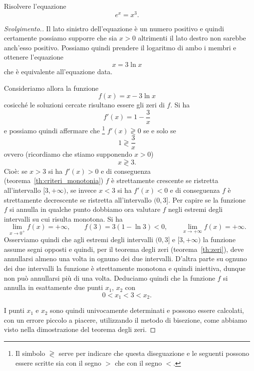 \begin{exercise}
Risolvere l'equazione
\begin{equation} \label{eq:4734521}
  e^x = x^3.
\end{equation}
\end{exercise}
%
\begin{proof}[Svolgimento.]
Il lato sinistro dell'equazione è un numero positivo e quindi
certamente possiamo supporre che sia $x>0$ altrimenti il lato destro non sarebbe anch'esso positivo.
Possiamo quindi prendere il logaritmo di ambo i membri
e ottenere l'equazione
\[
  x = 3 \ln x
\]
che è equivalente all'equazione data.

Consideriamo allora la funzione
\[
 f(x) = x - 3 \ln x
\]
cosicché le soluzioni cercate risultano essere gli zeri di $f$.
Si ha
\[
  f'(x) = 1 - \frac{3}{x}
\]
e possiamo quindi affermare che%
\footnote{Il simbolo $\gtrless$ serve per indicare che questa
diseguazione e le seguenti possono essere scritte sia con il segno
$>$ che con il segno $<$.}
 $f'(x) \gtrless 0$
se e solo se
\[
  1 \gtrless \frac 3 x
\]
ovvero (ricordiamo che stiamo supponendo $x>0$)
\[
  x \gtrless 3.
\]
Cioè: se $x>3$ si ha $f'(x)>0$ e di conseguenza
(teorema~\ref{th:criteri_monotonia})
$f$ è strettamente crescente se ristretta all'intervallo
$[3,+\infty)$,
se invece $x<3$ si ha $f'(x)<0$ e di conseguenza
$f$ è strettamente decrescente se ristretta all'intervallo
$(0,3]$.
Per capire se la funzione $f$ si annulla in qualche punto
dobbiamo ora valutare $f$ negli estremi degli intervalli su cui risulta monotona. Si ha
\[
  \lim_{x\to 0^+} f(x) = +\infty, \qquad
  f(3) = 3 (1 - \ln 3) <0, \qquad
  \lim_{x\to +\infty} f(x) = +\infty.
\]
Osserviamo quindi che agli estremi degli intervalli
$(0,3]$ e $[3,+\infty)$ la funzione assume segni opposti e quindi, per il teorema degli zeri (teorema~\ref{th:zeri}), deve annullarsi almeno una volta in ognuno dei due intervalli. D'altra parte su ognuno dei due intervalli la funzione è strettamente monotona e quindi iniettiva, dunque non può annullarsi più di una volta. Deduciamo quindi che la funzione $f$ si annulla in esattamente due punti $x_1$, $x_2$ con
\[
  0 < x_1 < 3 < x_2.
\]

I punti $x_1$ e $x_2$ sono quindi univocamente determinati
e possono essere calcolati, con un errore piccolo a piacere,
utilizzando il metodo di bisezione, come abbiamo
visto nella dimostrazione del teorema degli zeri.
\end{proof}

